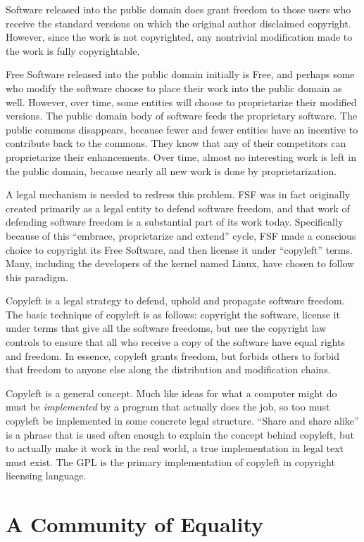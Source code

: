 Software released into the public domain does grant freedom to those users
who receive the standard versions on which the original author disclaimed
copyright. However, since the work is not copyrighted, any nontrivial
modification made to the work is fully copyrightable.

Free Software released into the public domain initially is Free, and
perhaps some who modify the software choose to place their work into the
public domain as well. However, over time, some entities will choose to
proprietarize their modified versions. The public domain body of software
feeds the proprietary software. The public commons disappears, because
fewer and fewer entities have an incentive to contribute back to the
commons. They know that any of their competitors can proprietarize their
enhancements. Over time, almost no interesting work is left in the public
domain, because nearly all new work is done by proprietarization.

A legal mechanism is needed to redress this problem. FSF was in fact
originally created primarily as a legal entity to defend software freedom,
and that work of defending software freedom is a substantial part of
its work today. Specifically because of this ``embrace, proprietarize and
extend'' cycle, FSF made a conscious choice to copyright its Free Software,
and then license it under ``copyleft'' terms. Many, including the
developers of the kernel named Linux, have chosen to follow this paradigm.

Copyleft is a legal strategy to defend, uphold and propagate software
freedom. The basic technique of copyleft is as follows: copyright the
software, license it under terms that give all the software freedoms, but
use the copyright law controls to ensure that all who receive a copy of
the software have equal rights and freedom. In essence, copyleft grants
freedom, but forbids others to forbid that freedom to anyone else along
the distribution and modification chains.

Copyleft is a general concept. Much like ideas for what a computer might
do must be \emph{implemented} by a program that actually does the job, so
too must copyleft be implemented in some concrete legal structure.
``Share and share alike'' is a phrase that is used often enough to explain the
concept behind copyleft, but to actually make it work in the real world, a
true implementation in legal text must exist. The GPL is the primary
implementation of copyleft in copyright licensing language.

\section{A Community of Equality}

